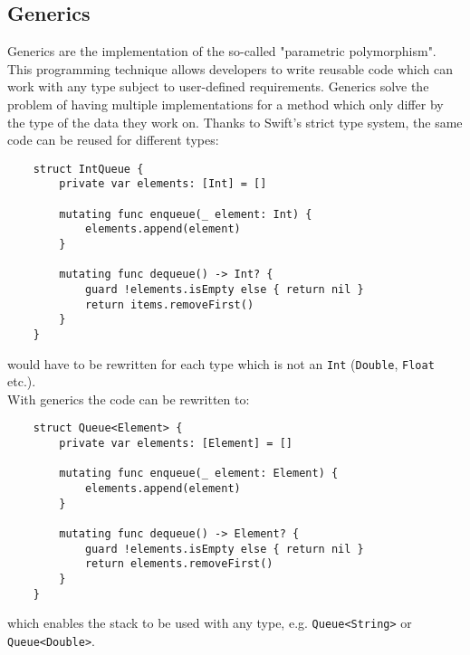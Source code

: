\subsection{Generics}
Generics are the implementation of the so-called "parametric polymorphism". This programming technique allows developers to write reusable code which can work with any type subject to user-defined requirements. Generics solve the problem of having multiple implementations for a method which only differ by the type of the data they work on. Thanks to Swift's strict type system, the same code can be reused for different types:
\begin{verbatim}
    struct IntQueue {
        private var elements: [Int] = []
        
        mutating func enqueue(_ element: Int) {
            elements.append(element)
        }
        
        mutating func dequeue() -> Int? {
            guard !elements.isEmpty else { return nil }
            return items.removeFirst()
        }
    }
\end{verbatim}
would have to be rewritten for each type which is not an \lstinline{Int} (\lstinline{Double}, \lstinline{Float} etc.). \\
With generics the code can be rewritten to:
\begin{verbatim}
    struct Queue<Element> {
        private var elements: [Element] = []
        
        mutating func enqueue(_ element: Element) {
            elements.append(element)
        }
        
        mutating func dequeue() -> Element? {
            guard !elements.isEmpty else { return nil }
            return elements.removeFirst()
        }
    }
\end{verbatim}
which enables the stack to be used with any type, e.g. \lstinline{Queue<String>} or \lstinline{Queue<Double>}.

